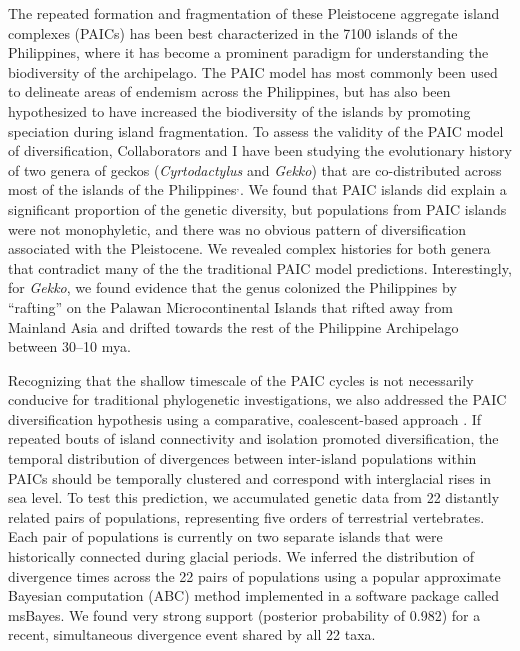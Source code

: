 \documentclass[10pt]{article}
\newcommand{\super}[1]{\ensuremath{^{\textrm{#1}}}}
\begin{document}
The repeated formation and fragmentation of these Pleistocene aggregate island complexes (PAICs) has been best characterized in the 7100\+ islands of the Philippines, where it has become a prominent paradigm for understanding the biodiversity of the archipelago.
The PAIC model has most commonly been used to delineate areas of endemism across the Philippines, but has also been hypothesized to have increased the biodiversity of the islands by promoting speciation during island fragmentation.
To assess the validity of the PAIC model of diversification, Collaborators and I have been studying the evolutionary history of two genera of geckos (\emph{Cyrtodactylus} and \emph{Gekko}) that are co-distributed across most of the islands of the Philippines\cite{Siler2010}\super{,}\cite{Siler2012}.
We found that PAIC islands did explain a significant proportion of the genetic diversity, but populations from PAIC islands were not monophyletic, and there was no obvious pattern of diversification associated with the Pleistocene.
We revealed complex histories for both genera that contradict many of the the traditional PAIC model predictions.
Interestingly, for \emph{Gekko}, we found evidence that the genus colonized the Philippines by ``rafting'' on the Palawan Microcontinental Islands that rifted away from Mainland Asia and drifted towards the rest of the Philippine Archipelago between 30--10 mya.

Recognizing that the shallow timescale of the PAIC cycles is not necessarily conducive for traditional phylogenetic investigations, we also addressed the PAIC diversification hypothesis using a comparative, coalescent-based approach \cite{Oaks2012}.
If repeated bouts of island connectivity and isolation promoted diversification, the temporal distribution of divergences between inter-island populations within PAICs should be temporally clustered and correspond with interglacial rises in sea level.
To test this prediction, we accumulated genetic data from 22 distantly related pairs of populations, representing five orders of terrestrial vertebrates.
Each pair of populations is currently on two separate islands that were historically connected during glacial periods.
We inferred the distribution of divergence times across the 22 pairs of populations using a popular approximate Bayesian computation (ABC) method implemented in a software package called msBayes.
We found very strong support (posterior probability of 0.982) for a recent, simultaneous divergence event shared by all 22 taxa.
\end{document}
